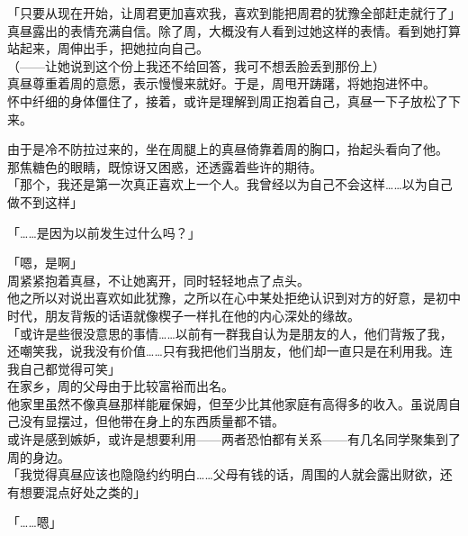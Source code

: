 「只要从现在开始，让周君更加喜欢我，喜欢到能把周君的犹豫全部赶走就行了」\\

真昼露出的表情充满自信。除了周，大概没有人看到过她这样的表情。看到她打算站起来，周伸出手，把她拉向自己。\\

（——让她说到这个份上我还不给回答，我可不想丢脸丢到那份上）\\

真昼尊重着周的意愿，表示慢慢来就好。于是，周甩开踌躇，将她抱进怀中。\\

怀中纤细的身体僵住了，接着，或许是理解到周正抱着自己，真昼一下子放松了下来。

由于是冷不防拉过来的，坐在周腿上的真昼倚靠着周的胸口，抬起头看向了他。\\

那焦糖色的眼睛，既惊讶又困惑，还透露着些许的期待。\\

「那个，我还是第一次真正喜欢上一个人。我曾经以为自己不会这样……以为自己做不到这样」

「……是因为以前发生过什么吗？」

「嗯，是啊」\\

周紧紧抱着真昼，不让她离开，同时轻轻地点了点头。\\

他之所以对说出喜欢如此犹豫，之所以在心中某处拒绝认识到对方的好意，是初中时代，朋友背叛的话语就像楔子一样扎在他的内心深处的缘故。\\

「或许是些很没意思的事情……以前有一群我自认为是朋友的人，他们背叛了我，还嘲笑我，说我没有价值……只有我把他们当朋友，他们却一直只是在利用我。连我自己都觉得可笑」\\

在家乡，周的父母由于比较富裕而出名。\\

他家里虽然不像真昼那样能雇保姆，但至少比其他家庭有高得多的收入。虽说周自己没有显摆过，但他带在身上的东西质量都不错。\\

或许是感到嫉妒，或许是想要利用——两者恐怕都有关系——有几名同学聚集到了周的身边。\\

「我觉得真昼应该也隐隐约约明白……父母有钱的话，周围的人就会露出财欲，还有想要混点好处之类的」

「……嗯」\\


